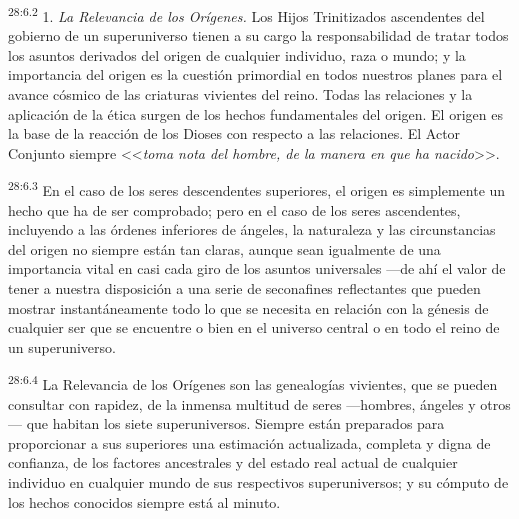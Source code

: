 \par
\textsuperscript{28:6.2} 1. \textit{La Relevancia de los Orígenes.} Los Hijos Trinitizados ascendentes del gobierno de un superuniverso tienen a su cargo la responsabilidad de tratar todos los asuntos derivados del origen de cualquier individuo, raza o mundo; y la importancia del origen es la cuestión primordial en todos nuestros planes para el avance cósmico de las criaturas vivientes del reino. Todas las relaciones y la aplicación de la ética surgen de los hechos fundamentales del origen. El origen es la base de la reacción de los Dioses con respecto a las relaciones. El Actor Conjunto siempre <<\textit{toma nota del hombre, de la manera en que ha nacido}>>.

\par
\textsuperscript{28:6.3} En el caso de los seres descendentes superiores, el origen es simplemente un hecho que ha de ser comprobado; pero en el caso de los seres ascendentes, incluyendo a las órdenes inferiores de ángeles, la naturaleza y las circunstancias del origen no siempre están tan claras, aunque sean igualmente de una importancia vital en casi cada giro de los asuntos universales ---de ahí el valor de tener a nuestra disposición a una serie de seconafines reflectantes que pueden mostrar instantáneamente todo lo que se necesita en relación con la génesis de cualquier ser que se encuentre o bien en el universo central o en todo el reino de un superuniverso.

\par
\textsuperscript{28:6.4} La Relevancia de los Orígenes son las genealogías vivientes, que se pueden consultar con rapidez, de la inmensa multitud de seres ---hombres, ángeles y otros--- que habitan los siete superuniversos. Siempre están preparados para proporcionar a sus superiores una estimación actualizada, completa y digna de confianza, de los factores ancestrales y del estado real actual de cualquier individuo en cualquier mundo de sus respectivos superuniversos; y su cómputo de los hechos conocidos siempre está al minuto.

